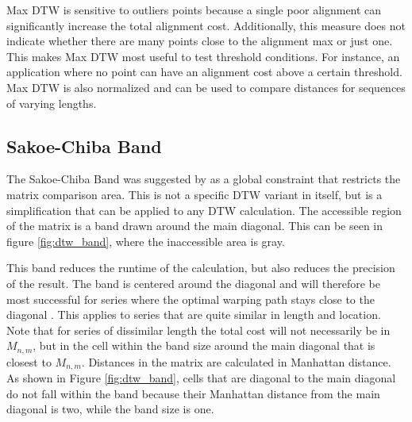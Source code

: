 Max DTW is sensitive to outliers points because a single poor alignment can significantly increase the total alignment cost. Additionally, this measure does not indicate whether there are many points close to the alignment max or just one. This makes Max DTW most useful to test threshold conditions. For instance, an application where no point can have an alignment cost above a certain threshold. Max DTW is also normalized and can be used to compare distances for sequences of varying lengths.

\subsection{Sakoe-Chiba Band}
\label{sec:sakoe}
The Sakoe-Chiba Band was suggested by \textcite{sakoe1978dynamic} as a global constraint that restricts the matrix comparison area. This is not a specific DTW variant in itself, but is a simplification that can be applied to any DTW calculation. The accessible region of the matrix is a band drawn around the main diagonal. This can be seen in figure \ref{fig:dtw_band}, where the inaccessible area is gray.

This band reduces the runtime of the calculation, but also reduces the precision of the result. The band is centered around the diagonal and will therefore be most successful for series where the optimal warping path stays close to the diagonal \cite{sakoe1978dynamic}. This applies to series that are quite similar in length and location. Note that for series of dissimilar length the total cost will not necessarily be in $M_{n,m}$, but in the cell within the band size around the main diagonal that is closest to $M_{n,m}$. Distances in the matrix are calculated in Manhattan distance. As shown in Figure \ref{fig:dtw_band}, cells that are diagonal to the main diagonal do not fall within the band because their Manhattan distance from the main diagonal is two, while the band size is one.

